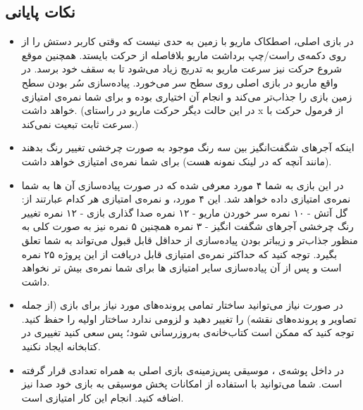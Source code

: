 \documentclass{utap}
\begin{document}
	\subsection{نکات پایانی}
	\begin{itemize}
		\item
در بازی اصلی، اصطکاک ماریو با زمین به حدی نیست که وقتی کاربر دستش را از روی دکمه‌ی راست/چپ برداشت ماریو بلافاصله از حرکت بایستد. همچنین موقع شروع حرکت نیز سرعت ماریو به تدریج زیاد می‌شود تا به سقف خود برسد. در واقع ماریو در بازی اصلی روی سطح سر می‌خورد. پیاده‌سازی سُر بودن سطح زمین بازی را جذاب‌تر می‌کند و انجام آن اختیاری بوده و برای شما نمره‌ی امتیازی خواهد داشت. (در این حالت دیگر حرکت ماریو در راستای x از فرمول حرکت با سرعت ثابت تبعیت نمی‌کند.)
		\item
اینکه آجر‌های شگفت‌انگیز بین سه رنگ موجود به صورت چرخشی تغییر رنگ بدهند (مانند آنچه که در لینک نمونه هست) برای شما نمره‌ی امتیازی خواهد داشت.
	\item
	در این بازی به شما ۴ مورد معرفی شده که در صورت پیاده‌سازی آن ها به شما نمره‌ی امتیازی داده خواهد شد. این ۴ مورد، و نمره‌ی امتیازی هر کدام عبارتند از:
\newline	گل آتش - ۱۰ نمره
\newline	سر خوردن ماریو - ۱۲ نمره
\newline	صدا گذاری بازی - ۱۲ نمره
\newline	تغییر رنگ چرخشی آجر‌های شگفت انگیز - ۳ نمره
\newline همچنین ۵ نمره نیز به صورت کلی به منظور جذاب‌تر و زیباتر بودن پیاده‌سازی از حداقل قابل قبول می‌تواند به شما تعلق بگیرد. توجه کنید که حداکثر نمره‌ی امتیازی قابل دریافت از این پروژه ۲۵ نمره است و پس از آن پیاده‌سازی سایر امتیازی ها برای شما نمره‌ی بیش تر نخواهد داشت.  
		\item
در صورت نیاز می‌توانید ساختار تمامی پرونده‌های مورد نیاز برای بازی (از جمله تصاویر و پرونده‌های نقشه) را تغییر دهید و لزومی ندارد ساختار اولیه را حفظ کنید.
توجه کنید که ممکن است کتاب‌خانه‌ی  به‌روزرسانی شود؛ پس سعی کنید تغییری در کتابخانه ایجاد نکنید.
		\item
در داخل پوشه‌ی ، موسیقی پس‌زمینه‌ی بازی اصلی به همراه تعدادی  قرار گرفته است. شما می‌توانید با استفاده از امکانات پخش موسیقی  به بازی خود صدا نیز اضافه کنید. انجام این کار امتیازی است.
	\end{itemize}
\end{document}
